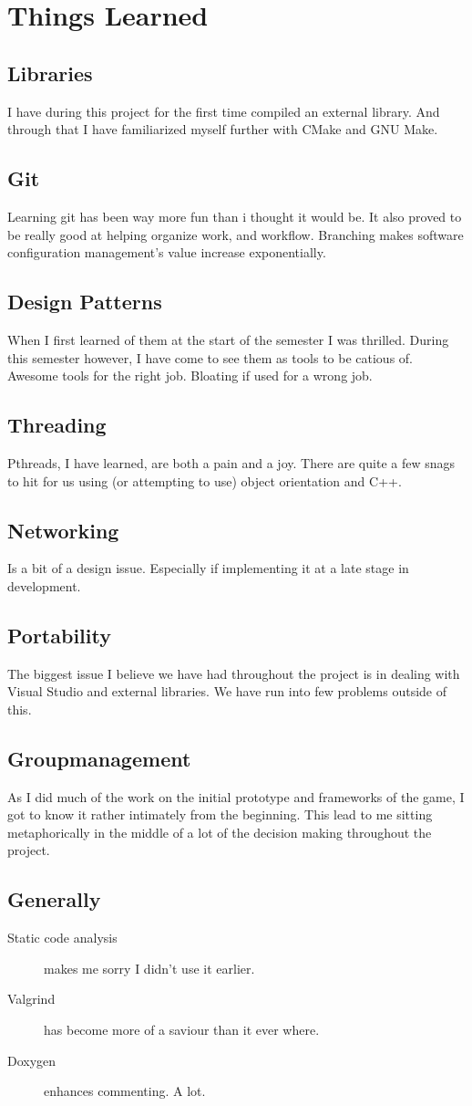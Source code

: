 \documentclass[a4paper,twoside]{article}
\begin{document}
\section{Things Learned}
\subsection{Libraries}
I have during this project for the first time compiled an external library. And
through that I have familiarized myself further with CMake and GNU Make.

\subsection{Git}
Learning git has been way more fun than i thought it would be. It also proved to be
really good at helping organize work, and workflow. Branching makes software 
configuration management's value increase exponentially.

\subsection{Design Patterns}
When I first learned of them at the start of the semester I was thrilled. During
this semester however, I have come to see them as tools to be catious of. Awesome
tools for the right job. Bloating if used for a wrong job.

\subsection{Threading}
Pthreads, I have learned, are both a pain and a joy. There are quite a few snags
to hit for us using (or attempting to use) object orientation and C++.

\subsection{Networking}
Is a bit of a design issue. Especially if implementing it at a late stage in 
development.

\subsection{Portability}
The biggest issue I believe we have had throughout the project is in dealing with
Visual Studio and external libraries. We have run into few problems outside of this.

\subsection{Groupmanagement}
As I did much of the work on the initial prototype and frameworks of the game, I 
got to know it rather intimately from the beginning. This lead to me sitting 
metaphorically in the middle of a lot of the decision making throughout the project.

\subsection{Generally}
\begin{description}
 \item [Static code analysis] makes me sorry I didn't use it earlier.
 \item [Valgrind] has become more of a saviour than it ever where.
 \item [Doxygen] enhances commenting. A lot.
 \item []
\end{description}
\end{document}
